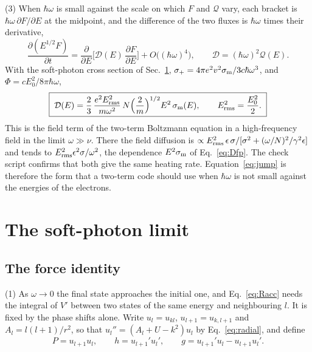 \documentclass[11pt]{article}
\numberwithin{equation}{section}
\newcommand{\sm}{\sigma_{\rm m}}
\begin{document}
{\noindent}(3) When $\hbar\omega$ is small against the scale on which $F$ and
$\mathcal Q$ vary, each bracket is $\hbar\omega\,\partial F/\partial E$ at the
midpoint, and the difference of the two fluxes is $\hbar\omega$ times their
derivative,
\begin{equation}
\frac{\partial(E^{1/2}F)}{\partial t}=\frac{\partial}{\partial E}
\Big[\mathcal D(E)\,\frac{\partial F}{\partial E}\Big]+O\big((\hbar\omega)^4\big),
\qquad \mathcal D=(\hbar\omega)^2\mathcal Q(E).
\end{equation}
With the soft-photon cross section of Sec.~\ref{sec:soft},
$\sigma_+=4\pi e^2v^2\sm/3c\hbar\omega^3$, and $\Phi=cE_0^2/8\pi\hbar\omega$,
\begin{equation}
\boxed{\;\mathcal D(E)=\frac{2}{3}\,\frac{e^2E_{\rm rms}^2}{m\omega^2}\,
N\Big(\frac2m\Big)^{1/2}E^2\,\sm(E),\qquad E_{\rm rms}^2=\frac{E_0^2}{2}.\;}
\label{eq:Dfp}
\end{equation}
This is the field term of the two-term Boltzmann equation in a high-frequency
field \cite{HagelaarPitchford2005} in the limit $\omega\gg\nu$. There the field
diffusion is $\propto E_{\rm rms}^2\,\epsilon\,\sigma/[\sigma^2+(\omega/N)^2/\gamma^2\epsilon]$
and tends to $E_{\rm rms}^2\epsilon^2\sigma/\omega^2$, the dependence $E^2\sm$ of
Eq.~\eqref{eq:Dfp}. The check script confirms that both give the same heating
rate. Equation~\eqref{eq:jump} is therefore the form that a two-term code should
use when $\hbar\omega$ is not small against the energies of the electrons.

\section{The soft-photon limit}
\label{sec:soft}

\subsection{The force identity}
\label{sec:force}
{\noindent}(1) As $\omega\to0$ the final state approaches the initial one, and
Eq.~\eqref{eq:Racc} needs the integral of $V'$ between two states of the same
energy and neighbouring $l$. It is fixed by the phase shifts alone. Write
$u_l=u_{kl}$, $u_{l+1}=u_{k,l+1}$ and $A_l=l(l+1)/r^2$, so that
$u_l''=(A_l+U-k^2)u_l$ by Eq.~\eqref{eq:radial}, and define
\begin{equation}
P=u_{l+1}u_l,\qquad h=u_{l+1}'u_l',\qquad g=u_{l+1}'u_l-u_{l+1}u_l' .
\end{equation}
\end{document}
